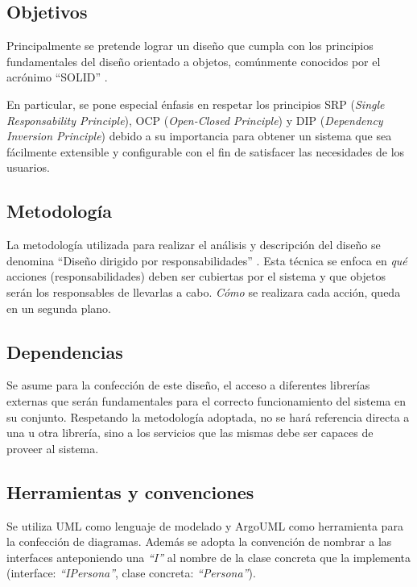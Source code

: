 \documentclass[a4paper,10pt]{article}
\begin{document}
\subsection{Objetivos}

Principalmente se pretende lograr un dise\~no que cumpla con los principios
fundamentales del dise\~no orientado a objetos, com\'unmente conocidos por el
acr\'onimo ``SOLID'' \cite{martin00}.

En particular, se pone especial \'enfasis en respetar los principios SRP
(\textit{Single Responsability Principle}), OCP (\textit{Open-Closed
Principle}) y DIP (\textit{Dependency Inversion Principle})
debido a su importancia para obtener un sistema que sea f\'acilmente extensible
y configurable con el fin de satisfacer las necesidades de los usuarios.
  
\subsection{Metodolog\'ia}

La metodolog\'ia utilizada para realizar el an\'alisis y descripci\'on del
dise\~no se denomina ``Dise\~no dirigido por responsabilidades''
\cite{wirfsbrok03}. Esta t\'ecnica se enfoca en \textit{qu\'e} acciones
(responsabilidades) deben ser cubiertas por el sistema y que objetos ser\'an los
responsables de llevarlas a cabo. \textit{C\'omo} se realizara cada acci\'on,
queda en un segunda plano.

\subsection{Dependencias}

Se asume para la confecci\'on de este dise\~no, el acceso a diferentes
librer\'ias externas que ser\'an fundamentales para el correcto funcionamiento
del sistema en su conjunto. Respetando la metodolog\'ia adoptada, no se har\'a
referencia directa a una u otra librer\'ia, sino a los servicios que las mismas
debe ser capaces de proveer al sistema.

\subsection{Herramientas y convenciones}

Se utiliza UML\cite{uml} como lenguaje de modelado y ArgoUML\cite{argoUML}
como herramienta para la confecci\'on de diagramas. Adem\'as se adopta la
convenci\'on de nombrar a las interfaces anteponiendo una \textit{``I''} al
nombre de la clase concreta que la implementa (interface: \textit{``IPersona''},
clase concreta: \textit{``Persona''}).
\end{document}
